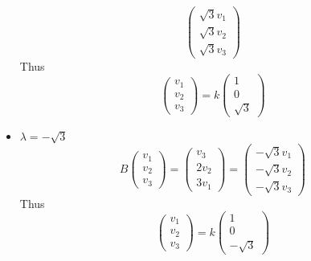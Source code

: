 \documentclass[11pt]{article}
\theoremstyle{mystyle}
\theoremstyle{definition}
\begin{document}
\begin{itemize}
\[\begin{pmatrix}
      \sqrt{3} v_1 \\ 
      \sqrt{3} v_2 \\
      \sqrt{3} v_3
    \end{pmatrix}
    \]
    Thus 
    \[
      \begin{pmatrix}
        v_1 \\
        v_2 \\
        v_3 
      \end{pmatrix}
      = k 
      \begin{pmatrix}
        1 \\
        0 \\
        \sqrt{3}
      \end{pmatrix}
    \]
  \item $\lambda = -\sqrt{3}$ \\
    \[
    B 
    \begin{pmatrix}
      v_1 \\
      v_2 \\
      v_3
    \end{pmatrix} = 
    \begin{pmatrix}
      v_3 \\
      2v_2 \\
      3v_1
    \end{pmatrix} 
    = 
    \begin{pmatrix}
      -\sqrt{3}v_1 \\ 
      -\sqrt{3}v_2 \\
      -\sqrt{3}v_3
    \end{pmatrix}
    \]
    Thus 
    \[
      \begin{pmatrix}
        v_1 \\
        v_2 \\
        v_3 
      \end{pmatrix}
      = k 
      \begin{pmatrix}
        1 \\
        0 \\
        -\sqrt{3}
      \end{pmatrix}
    \]
\end{itemize}
\end{document}
